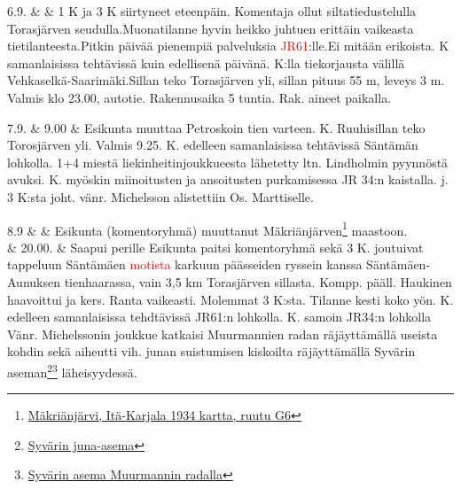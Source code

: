 \documentclass[11pt,a5paper,oneside]{book}
\begin{document}
6.9. & & 1 K ja 3 K siirtyneet eteenpäin. Komentaja ollut siltatiedustelulla Torasjärven seudulla.\newline Muonatilanne hyvin heikko juhtuen erittäin vaikeasta tietilanteesta.\newline Pitkin päivää pienempiä palveluksia \textcolor{red}{JR61}:lle.\newline Ei mitään erikoista. \newline{} K samanlaisissa tehtävissä kuin edellisenä päivänä.  K:lla tiekorjausta välillä Vehkaselkä-Saarimäki.\newline Sillan teko Torasjärven yli, sillan pituus 55 m, leveys 3 m. Valmis klo 23.00, autotie. Rakennusaika 5 tuntia. Rak. aineet paikalla.\\

\taulustop


7.9. & 9.00 & Esikunta muuttaa Petroskoin tien varteen.  K. Ruuhisillan teko Torosjärven yli. Valmis 9.25.  K. edelleen samanlaisissa tehtävissä Säntämän lohkolla. 1+4 miestä liekinheitinjoukkueesta lähetetty ltn. Lindholmin pyynnöstä avuksi.  K. myöskin miinoitusten ja ansoitusten purkamisessa JR 34:n kaistalla.\newline {} j. 3 K:sta joht. vänr. Michelsson alistettiin Os. Marttiselle. \\

\newpage

8.9 & & Esikunta (komentoryhmä) muuttanut Mäkriänjärven\footnote{\href{https://www.google.fi/maps/place/Ozero+Megrozero/@61.0482539,33.4942843,9161m/}{Mäkriänjärvi, Itä-Karjala 1934 kartta, ruutu G6}} maastoon.\\

& 20.00. & Saapui perille \newline Esikunta paitsi komentoryhmä sekä 3 K. joutuivat tappeluun Säntämäen \textcolor{red}{motista} karkuun päässeiden ryssein kanssa Säntämäen-Aunuksen tienhaarassa, vain 3,5 km Torasjärven sillasta. Kompp. pääll. Haukinen haavoittui ja kers. Ranta vaikeasti. Molemmat 3 K:sta. Tilanne kesti koko yön.  K. edelleen samanlaisissa tehdtävissä JR61:n lohkolla.  K. samoin JR34:n lohkolla Vänr. Michelssonin joukkue katkaisi Muurmannien radan räjäyttämällä useista kohdin sekä aiheutti vih. junan suistumisen kiskoilta räjäyttämällä Syvärin aseman\footnote{\href{https://www.google.fi/maps/place/Svirj/@60.9491397,34.0823469,17z/}{Syvärin juna-asema}}\footnote{\href{https://www.sotahistoriallisetkohteet.fi/app/sights/view/-/id/642/country/9/area/85/}{Syvärin asema Muurmannin radalla}} läheisyydessä. \\
\end{document}
